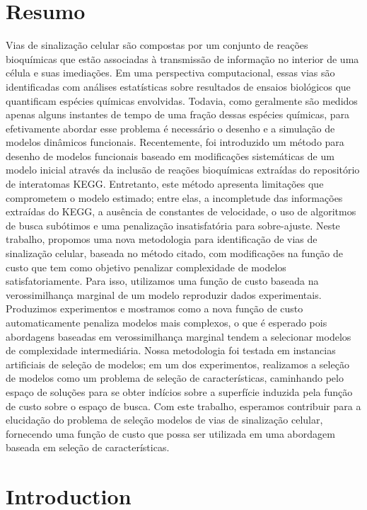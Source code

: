 \documentclass[12pt, twoside, bibliography=totoc]{report}
\numberwithin{mydefinition}{section}
\numberwithin{mytheorem}{section}
\numberwithin{mylemma}{section}
\numberwithin{corollary}{section}
\begin{document}
\chapter*{Resumo}
Vias de sinalização celular são compostas por um conjunto de reações
bioquímicas que estão associadas à transmissão de informação no interior
de uma célula e suas imediações. Em uma perspectiva computacional, essas
vias são identificadas com análises estatísticas sobre resultados de 
ensaios biológicos que quantificam espécies químicas envolvidas.
Todavia, como geralmente são medidos apenas alguns instantes de tempo de
uma fração dessas espécies químicas, para efetivamente abordar esse
problema é necessário o desenho e a simulação de modelos dinâmicos
funcionais. Recentemente, foi introduzido um método para desenho de
modelos funcionais baseado em modificações sistemáticas de um modelo
inicial
através da inclusão de reações bioquímicas extraídas do repositório de
interatomas KEGG. Entretanto, este método apresenta limitações que
comprometem o modelo estimado; entre elas, a incompletude das
informações extraídas do KEGG, a ausência de constantes de velocidade, o
uso de algoritmos de busca subótimos e uma penalização insatisfatória
para sobre-ajuste. Neste trabalho, propomos uma nova metodologia para
identificação de vias de sinalização celular, baseada no método citado,
com modificações na função de custo que tem como objetivo penalizar
complexidade de modelos satisfatoriamente. Para isso, utilizamos uma
função de custo baseada na verossimilhança marginal de um modelo 
reproduzir dados experimentais. Produzimos experimentos e mostramos como
a nova função de custo automaticamente penaliza modelos mais complexos,
o que é esperado pois abordagens baseadas em verossimilhança marginal
tendem a selecionar modelos de complexidade intermediária. Nossa
metodologia foi testada em instancias artificiais de seleção de modelos;
em um dos experimentos, realizamos a seleção de modelos como um problema
de seleção de características, caminhando pelo espaço de soluções para
se obter indícios sobre a superfície induzida pela função de custo sobre
o espaço de busca. Com este trabalho, esperamos contribuir para a 
elucidação do problema de seleção modelos de vias de sinalização celular,
fornecendo uma função de custo que possa ser utilizada em uma abordagem
baseada em seleção de características.

\tableofcontents

\clearpage
{} 

\nocite{*}
\chapter{Introduction}
\label{chap:intro}

\end{document}
